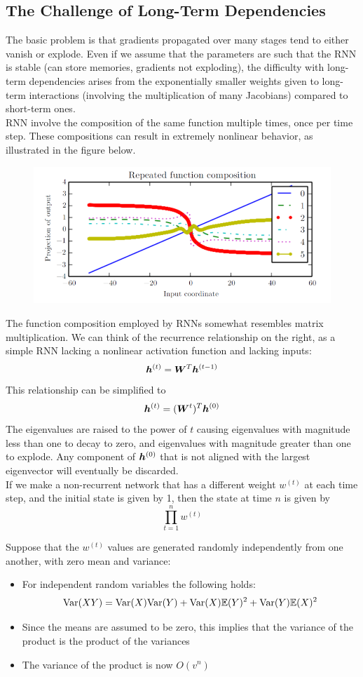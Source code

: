 \begin{multicols}{2}
	\subsection{The Challenge of Long-Term Dependencies}
	The basic problem is that gradients propagated over many stages tend to either vanish or explode.
	Even if we assume that the parameters are such that the RNN is stable (can store memories, gradients not exploding), the difficulty with long-term dependencies arises from the exponentially smaller weights given to long-term interactions (involving the multiplication of many Jacobians) compared to short-term ones.\\
	RNN involve the composition of the same function multiple times, once per time step.
	These compositions can result in extremely nonlinear behavior, as illustrated in the figure below.
	\begin{figure}[H]
		\centering
		\includegraphics[width=0.9\linewidth]{images/unstable.png}
	\end{figure}
	The function composition employed by RNNs somewhat resembles matrix multiplication.
	We can think of the recurrence relationship on the right, as a simple RNN lacking a nonlinear activation function and lacking inputs:
	\[ {\bm{h}}^{(t)} = {\bm{W}}^T{\bm{h}}^{(t-1)} \]
	This relationship can be simplified to
	\[ {\bm{h}}^{(t)} = ({\bm{W}}^t)^T {\bm{h}}^{(0)} \]
	The eigenvalues are raised to the power of $t$ causing eigenvalues with magnitude less than one to decay to zero, and eigenvalues with magnitude greater than one to explode.
	Any component of ${\bm{h}}^{(0)}$ that is not aligned with the largest eigenvector will eventually be discarded.\\
	
	If we make a non-recurrent network that has a different weight $w^{(t)}$ at each time step, and the initial state is given by 1, then the state at time $n$ is given by
	\[ \prod_{t=1}^{n}w^{(t)} \]
	
	Suppose that the $w^{(t)}$ values are generated randomly independently from one another, with zero mean and variance:
	\begin{itemize}
		\item For independent random variables the following holds: 
		\[ \text{Var}(XY) = \text{Var}(X)\text{Var}(Y)+\text{Var}(X)\mathbb{E}(Y)^2+\text{Var}(Y)\mathbb{E}(X)^2 \]
		\item Since the means are assumed to be zero, this implies that the variance of the product is the product of the variances
		\item The variance of the product is now $O(v^n)$
	\end{itemize}
	

\end{multicols}
